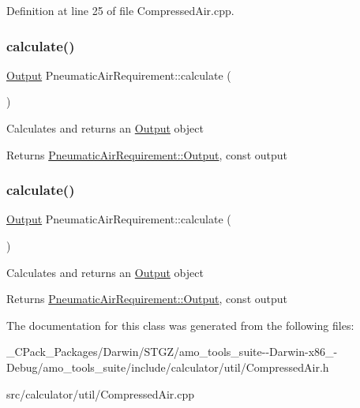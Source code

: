 Definition at line 25 of file Compressed\+Air.\+cpp.

\mbox{\label{class_pneumatic_air_requirement_ad49d3ecb061cc5a40aa2dc08432be04d}} 
\subsubsection{\texorpdfstring{calculate()}{calculate()}\hspace{0.1cm}{\footnotesize\ttfamily [2/3]}}
{\footnotesize\ttfamily \hyperlink{class_pneumatic_air_requirement_1_1_output}{Output} Pneumatic\+Air\+Requirement\+::calculate (\begin{DoxyParamCaption}{ }\end{DoxyParamCaption})}

Calculates and returns an \hyperlink{class_pneumatic_air_requirement_1_1_output}{Output} object \begin{DoxyReturn}{Returns}
\hyperlink{class_pneumatic_air_requirement_1_1_output}{Pneumatic\+Air\+Requirement\+::\+Output}, const output 
\end{DoxyReturn}
\mbox{\label{class_pneumatic_air_requirement_ad49d3ecb061cc5a40aa2dc08432be04d}} 
\subsubsection{\texorpdfstring{calculate()}{calculate()}\hspace{0.1cm}{\footnotesize\ttfamily [3/3]}}
{\footnotesize\ttfamily \hyperlink{class_pneumatic_air_requirement_1_1_output}{Output} Pneumatic\+Air\+Requirement\+::calculate (\begin{DoxyParamCaption}{ }\end{DoxyParamCaption})}

Calculates and returns an \hyperlink{class_pneumatic_air_requirement_1_1_output}{Output} object \begin{DoxyReturn}{Returns}
\hyperlink{class_pneumatic_air_requirement_1_1_output}{Pneumatic\+Air\+Requirement\+::\+Output}, const output 
\end{DoxyReturn}


The documentation for this class was generated from the following files\+:\begin{DoxyCompactItemize}
\item 
\+\_\+\+C\+Pack\+\_\+\+Packages/\+Darwin/\+S\+T\+G\+Z/amo\+\_\+tools\+\_\+suite-\/-\/\+Darwin-\/x86\+\_-\/\+Debug/amo\+\_\+tools\+\_\+suite/include/calculator/util/Compressed\+Air.\+h\item 
src/calculator/util/Compressed\+Air.\+cpp\end{DoxyCompactItemize}
